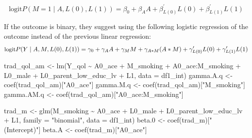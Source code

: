 \documentclass[
]{book}
\newenvironment{Shaded}{\begin{snugshade}}{\end{snugshade}}
\newcommand{\AttributeTok}[1]{\textcolor[rgb]{0.77,0.63,0.00}{#1}}
\newcommand{\FloatTok}[1]{\textcolor[rgb]{0.00,0.00,0.81}{#1}}
\newcommand{\FunctionTok}[1]{\textcolor[rgb]{0.00,0.00,0.00}{#1}}
\newcommand{\NormalTok}[1]{#1}
\newcommand{\OtherTok}[1]{\textcolor[rgb]{0.56,0.35,0.01}{#1}}
\newcommand{\SpecialCharTok}[1]{\textcolor[rgb]{0.00,0.00,0.00}{#1}}
\newcommand{\StringTok}[1]{\textcolor[rgb]{0.31,0.60,0.02}{#1}}
\begin{document}
\begin{equation} 
\text{logit}P(M=1 \mid A,L(0),L(1)) = \beta_0 + \beta_A A + \beta_{L(0)}^\prime L(0) + \beta_{L(1)}^\prime L(1)
\label{eq:medreg}
\end{equation}

If the outcome is binary, they suggest using the following logistic regression of the outcome instead of the previous linear regression:
\begin{equation}
\small
\text{logit}P(Y \mid A, M,L(0),L(1)) = \gamma_0 + \gamma_A A + \gamma_M M + \gamma_{A \ast M} (A \ast M) + \gamma_{L(0)}^\prime L(0) + \gamma_{L(1)}^\prime L(1) 
\label{eq:binoutcomereg}
\end{equation}

\begin{Shaded}
\begin{Highlighting}[]
\NormalTok{trad\_qol\_am }\OtherTok{\textless{}{-}} \FunctionTok{lm}\NormalTok{(Y\_qol }\SpecialCharTok{\textasciitilde{}}\NormalTok{ A0\_ace }\SpecialCharTok{+}\NormalTok{ M\_smoking }\SpecialCharTok{+}\NormalTok{ A0\_ace}\SpecialCharTok{:}\NormalTok{M\_smoking }\SpecialCharTok{+}
\NormalTok{                    L0\_male }\SpecialCharTok{+}\NormalTok{ L0\_parent\_low\_educ\_lv }\SpecialCharTok{+}\NormalTok{ L1,}
                  \AttributeTok{data =}\NormalTok{ df1\_int)}
\NormalTok{gamma.A.q }\OtherTok{\textless{}{-}} \FunctionTok{coef}\NormalTok{(trad\_qol\_am)[}\StringTok{"A0\_ace"}\NormalTok{]}
\NormalTok{gamma.M.q }\OtherTok{\textless{}{-}} \FunctionTok{coef}\NormalTok{(trad\_qol\_am)[}\StringTok{"M\_smoking"}\NormalTok{]}
\NormalTok{gamma.AM.q }\OtherTok{\textless{}{-}} \FunctionTok{coef}\NormalTok{(trad\_qol\_am)[}\StringTok{"A0\_ace:M\_smoking"}\NormalTok{]}

\NormalTok{trad\_m }\OtherTok{\textless{}{-}} \FunctionTok{glm}\NormalTok{(M\_smoking }\SpecialCharTok{\textasciitilde{}}\NormalTok{ A0\_ace }\SpecialCharTok{+}\NormalTok{ L0\_male }\SpecialCharTok{+}\NormalTok{ L0\_parent\_low\_educ\_lv }\SpecialCharTok{+}\NormalTok{ L1, }
              \AttributeTok{family =} \StringTok{"binomial"}\NormalTok{,}
              \AttributeTok{data =}\NormalTok{ df1\_int)}
\NormalTok{beta}\FloatTok{.0} \OtherTok{\textless{}{-}} \FunctionTok{coef}\NormalTok{(trad\_m)[}\StringTok{"(Intercept)"}\NormalTok{]}
\NormalTok{beta.A }\OtherTok{\textless{}{-}} \FunctionTok{coef}\NormalTok{(trad\_m)[}\StringTok{"A0\_ace"}\NormalTok{]}


\end{Highlighting}
\end{Shaded}
\end{document}
